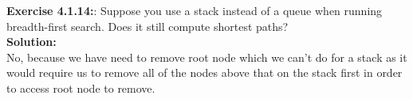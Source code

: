 \documentclass[11pt,fleqn]{article}
\begin{document}
\textbf{Exercise 4.1.14:}: Suppose you use a stack instead of a queue
when running breadth-first search. Does it still
compute shortest paths?\\

\textbf{Solution:}\\
No, because we have need to remove root node which we can't do for a stack as it would require us to remove all of the nodes above that on the stack first in order to access root node to remove.


	
\end{document}
